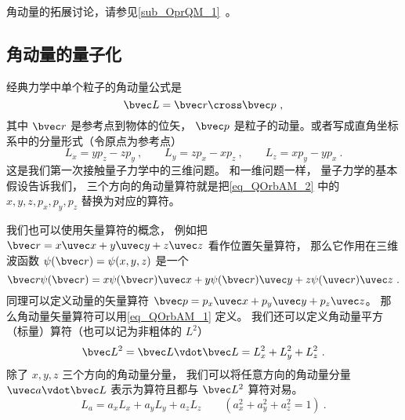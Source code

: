 
\begin{issues}
\issueDraft
\issueMissDepend
\end{issues}



角动量的拓展讨论，请参见\autoref{sub_OprQM_1}~。

\subsection{角动量的量子化}

经典力学中单个粒子的角动量公式是
\begin{equation}\label{eq_QOrbAM_1}
\bvec L = \bvec r \cross \bvec p~,
\end{equation}
其中 $\bvec r$ 是参考点到物体的位矢， $\bvec p$ 是粒子的动量。或者写成直角坐标系中的分量形式（令原点为参考点）
\begin{equation}\label{eq_QOrbAM_2}
L_x = y p_z - z p_y ~,\qquad
L_y = z p_x - x p_z ~,\qquad
L_z = x p_y - y p_x~.
\end{equation}   
这是我们第一次接触量子力学中的三维问题。 和一维问题一样， 量子力学的基本假设告诉我们， 三个方向的角动量算符就是把\autoref{eq_QOrbAM_2} 中的 $x, y, z, p_x, p_y, p_z$ 替换为对应的算符。

我们也可以使用矢量算符的概念， 例如把 $\bvec r = x\uvec x + y\uvec y + z\uvec z$ 看作位置矢量算符， 那么它作用在三维波函数 $\psi(\bvec r) = \psi(x, y, z)$ 是一个
\begin{equation}
\bvec r \psi(\bvec r) = x \psi(\bvec r) \uvec x + y \psi(\bvec r) \uvec y + z \psi(\uvec r) \uvec z~.
\end{equation}
同理可以定义动量的矢量算符 $\bvec p = p_x \uvec x + p_y\uvec y + p_z\uvec z$。 那么角动量矢量算符可以用\autoref{eq_QOrbAM_1} 定义。 我们还可以定义角动量平方（标量）算符（也可以记为非粗体的 $L^2$）
\begin{equation}
\bvec L^2 = \bvec L \vdot \bvec L = L_x^2 + L_y^2 + L_z^2~.
\end{equation}
除了 $x, y, z$ 三个方向的角动量分量， 我们可以将任意方向的角动量分量 $\uvec a \vdot \bvec L$ 表示为算符且都与 $\bvec L^2$ 算符对易。
\begin{equation}
L_a = a_x L_x + a_y L_y + a_z L_z \qquad (a_x^2 + a_y^2 + a_z^2 = 1)~.
\end{equation}

